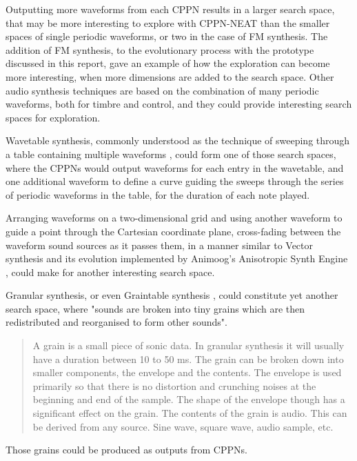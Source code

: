 \documentclass[conference]{IEEEtran}
\begin{document}
Outputting more waveforms from each CPPN results in a larger search space, that may be more interesting to explore with CPPN-NEAT than the smaller spaces of single periodic waveforms, or two in the case of FM synthesis.  The addition of FM synthesis, to the evolutionary process with the prototype discussed in this report, gave an example of how the exploration can become more interesting, when more dimensions are added to the search space.  Other audio synthesis techniques are based on the combination of many periodic waveforms, both for timbre and control, and they could provide interesting search spaces for exploration.

Wavetable synthesis, commonly understood as the technique of sweeping through a table containing multiple waveforms \cite{Thor-demystified-11}\cite{wikipedia-Wavetable-synthesis}\cite{origins-of-wavetable}, could form one of those search spaces, where the CPPNs would output waveforms for each entry in the wavetable, and one additional waveform to define a curve guiding the sweeps through the series of periodic waveforms in the table, for the duration of each note played.

Arranging waveforms on a two-dimensional grid and using another waveform to guide a point through the Cartesian coordinate plane, cross-fading between the waveform sound sources as it passes them, in a manner similar to Vector synthesis \cite{Vector-synthesis-Wikipedia} and its evolution implemented by Animoog's Anisotropic Synth Engine \cite{Animoog-ageofaudio}, could make for another interesting search space.

Granular synthesis, or even Graintable synthesis \cite{Granular-synthesis-Wikipedia}, could constitute yet another search space, where "sounds are broken into tiny grains which are then redistributed and reorganised to form other sounds"\cite{What-is-granular-synthesis}.
\begin{quote}
A grain is a small piece of sonic data. In granular synthesis it will usually have a duration between 10 to 50 ms. The grain can be broken down into smaller components, the envelope and the contents. The envelope is used primarily so that there is no distortion and crunching noises at the beginning and end of the sample. The shape of the envelope though has a significant effect on the grain. The contents of the grain is audio. This can be derived from any source. Sine wave, square wave, audio sample, etc.  \cite{What-is-granular-synthesis}
\end{quote}
Those grains could be produced as outputs from CPPNs.
\end{document}
